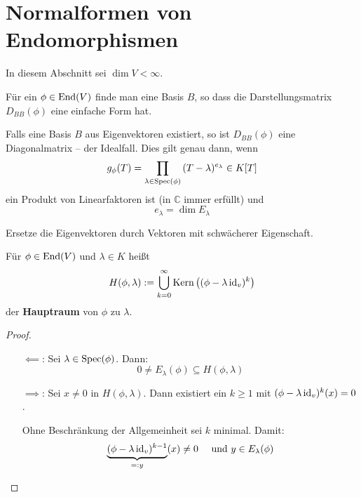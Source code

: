 \documentclass[parskip,a4paper,twoside,DIV15,BCOR12mm]{scrbook}
\begin{document}
\chapter{Normalformen von Endomorphismen}
In diesem Abschnitt sei \(\dim V<\infty\).
\begin{ziel}
Für ein \(\phi\in\operatorname{End}(V)\) finde man eine Basis \(B\), so dass die
Darstellungsmatrix \(D_{BB}(\phi)\) eine einfache Form hat.
\end{ziel}
\begin{remind}
Falls eine Basis \(B\) aus Eigenvektoren existiert, so ist \(D_{BB}(\phi)\) eine
Diagonalmatrix -- der Idealfall. Dies gilt genau dann, wenn
\[
g_{\phi}(T)=\prod_{\lambda\in\operatorname{Spec}(\phi)}{(T-\lambda)^{e_{\lambda}}}\in K[T]
\]
ein Produkt von Linearfaktoren ist (in \(\mathbb{C}\) immer erfüllt) und
\[
e_{\lambda}=\dim E_{\lambda}
\]
\end{remind}
\begin{strategie}
Ersetze die Eigenvektoren durch Vektoren mit schwächerer Eigenschaft.
\end{strategie}
\begin{definition}
Für \(\phi\in\operatorname{End}(V)\) und \(\lambda\in K\) heißt
\[
H(\phi,\lambda):=
    \bigcup_{k=0}^{\infty}{\operatorname{Kern}\left((\phi-\lambda\operatorname{id}_{v})^{k}\right)}
\]
der \textbf{Hauptraum} von \(\phi\) zu \(\lambda\).
\end{definition}
\begin{comment}[1]
\index{Untervektorraum}\index{Untervektorraum!invarianter}
\(H(\phi,\lambda)\) ist ein \(\phi\)-invarianter Untervektorraum von \(V\), denn
es gilt
\[
\Kern\left((\phi-\lambda\id_{v})^{k}\right)\subseteq
    \Kern\left((\phi-\lambda\id_{v})^{k+1}\right)
\]
und
\begin{align*}
(\phi-\lambda\id_{v})^{k}x&=0\\
(\phi-\lambda\id_{v})^{k}\phi(x)&=0
\end{align*}
\end{comment}
\begin{comment}[2]
\[
H(\phi,\lambda)\neq0\Longleftrightarrow\lambda\in\Spec(\phi)
\]
\end{comment}
\begin{proof}
\begin{itemize}
\item[\(\impliedby\):] Sei \(\lambda\in\operatorname{Spec}(\phi)\). Dann:
\[
0\neq E_{\lambda}(\phi)\subseteq H(\phi,\lambda)
\]
\item[\(\implies\):] Sei \(x\neq0\) in \(H(\phi,\lambda)\). Dann existiert
ein \(k\geq1\) mit \((\phi-\lambda\operatorname{id}_{v})^{k}(x)=0\).

Ohne Beschränkung der Allgemeinheit sei \(k\) minimal. Damit:
\[
\underbrace{(\phi-\lambda\operatorname{id}_{v})^{k-1}}_{=:y}(x)\neq0
    \quad\text{ und }y\in E_{\lambda}(\phi)
\]
\end{itemize}
\end{proof}
\end{document}
